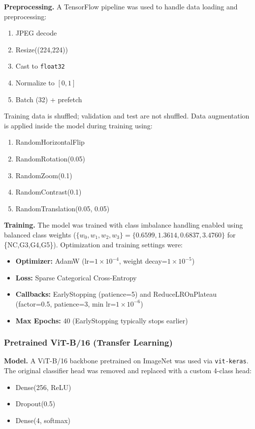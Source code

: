 \documentclass[conference]{IEEEtran}
\begin{document}
\textbf{Preprocessing.}
A TensorFlow pipeline was used to handle data loading and preprocessing:
\begin{enumerate}
    \item JPEG decode
    \item Resize((224,224))
    \item Cast to \texttt{float32}
    \item Normalize to $[0,1]$
    \item Batch (32) + prefetch
\end{enumerate}
Training data is shuffled; validation and test are not shuffled. Data augmentation is applied inside the model during training using:
\begin{enumerate}
    \item RandomHorizontalFlip
    \item RandomRotation(0.05)
    \item RandomZoom(0.1)
    \item RandomContrast(0.1)
    \item RandomTranslation(0.05, 0.05)
\end{enumerate}

\textbf{Training.}
The model was trained with class imbalance handling enabled using balanced class weights
($\{w_0,w_1,w_2,w_3\}=\{0.6599, 1.3614, 0.6837, 3.4760\}$ for \{NC,G3,G4,G5\}).
Optimization and training settings were:
\begin{itemize}
    \item \textbf{Optimizer:} AdamW (lr=$1\times10^{-4}$, weight decay=$1\times10^{-5}$)
    \item \textbf{Loss:} Sparse Categorical Cross-Entropy
    \item \textbf{Callbacks:} EarlyStopping (patience=5) and ReduceLROnPlateau (factor=0.5, patience=3, min lr=$1\times10^{-6}$)
    \item \textbf{Max Epochs:} 40 (EarlyStopping typically stops earlier)
\end{itemize}

\subsubsection{\textbf{Pretrained ViT-B/16 (Transfer Learning)}}

\textbf{Model.}
A ViT-B/16 backbone pretrained on ImageNet was used via \texttt{vit-keras}. The original classifier head was removed and replaced with a custom 4-class head:
\begin{itemize}
    \item Dense(256, ReLU)
    \item Dropout(0.5)
    \item Dense(4, softmax)
\end{itemize}
\end{document}
